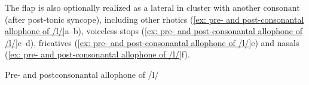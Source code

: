     \z
\z

The flap is also optionally realized as a lateral in cluster with another consonant (after post-tonic syncope), including other rhotics (\ref{ex: pre- and post-consonantal allophone of /l/}a--b), voiceless stops (\ref{ex: pre- and post-consonantal allophone of /l/}c--d), fricatives (\ref{ex: pre- and post-consonantal allophone of /l/}e) and nasals (\ref{ex: pre- and post-consonantal allophone of /l/}f).

\ea\label{ex: pre- and post-consonantal allophone of /l/}
{Pre- and postconsonantal allophone of /l/}

